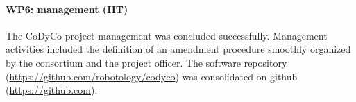 

\paragraph*{WP6: management (IIT)}

The CoDyCo project management was concluded successfully. Management activities included the definition of an amendment procedure smoothly organized by the consortium and the project officer. The software repository (\url{https://github.com/robotology/codyco}) was consolidated on github (\url{https://github.com}). 